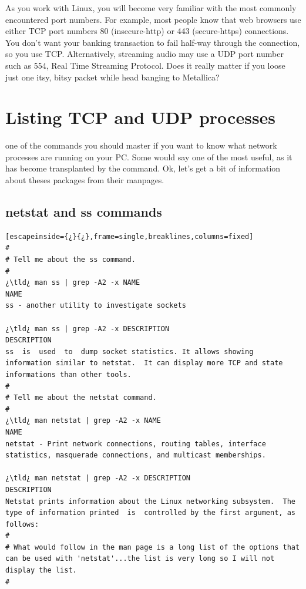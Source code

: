  As you work with Linux, you will become very familiar with the most commonly encountered port numbers. For example, most people know that web browsers use either TCP port numbers 80 (insecure-http) or 443 (secure-https) connections. You don't want your banking transaction to fail half-way through the connection, so you use TCP.  Alternatively, streaming audio may use a UDP port number such as 554, Real Time Streaming Protocol. Does it really matter if you loose just one itsy, bitsy packet while head banging to Metallica?

\section{Listing TCP and UDP processes}

  one of the commands you should master if you want to know what network processes are running on your PC. Some would say  one of the most useful, as it has become transplanted by the  command. Ok, let's get a bit of information about theses packages from their manpages.

\subsection{netstat and ss commands}

\begin{lstlisting}[escapeinside={¿}{¿},frame=single,breaklines,columns=fixed]
#
# Tell me about the ss command.
#
¿\tld¿ man ss | grep -A2 -x NAME
NAME
ss - another utility to investigate sockets

¿\tld¿ man ss | grep -A2 -x DESCRIPTION
DESCRIPTION
ss  is  used  to  dump socket statistics. It allows showing information similar to netstat.  It can display more TCP and state informations than other tools.
#
# Tell me about the netstat command.
#
¿\tld¿ man netstat | grep -A2 -x NAME
NAME
netstat - Print network connections, routing tables, interface statistics, masquerade connections, and multicast memberships.

¿\tld¿ man netstat | grep -A2 -x DESCRIPTION
DESCRIPTION
Netstat prints information about the Linux networking subsystem.  The type of information printed  is  controlled by the first argument, as follows:
#
# What would follow in the man page is a long list of the options that can be used with 'netstat'...the list is very long so I will not display the list.
#
\end{lstlisting}


